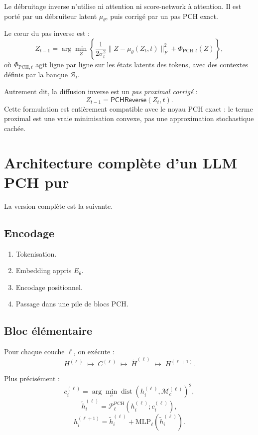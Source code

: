 \documentclass[11pt]{article}
\providecommand{\Ppch}{\mathcal P^{\mathrm{PCH}}}
\begin{document}
Le débruitage inverse n'utilise ni attention ni score-network à attention.
Il est porté par un débruiteur latent \(\mu_\theta\), puis corrigé par un pas PCH exact.

Le cœur du pas inverse est :
\[
Z_{t-1}
=
\arg\min_Z
\left\{
\frac1{2\sigma_t^2}\|Z-\mu_\theta(Z_t,t)\|_F^2
+
\Phi_{\mathrm{PCH},t}(Z)
\right\},
\]
où \(\Phi_{\mathrm{PCH},t}\) agit ligne par ligne sur les états latents des tokens, avec des contextes définis par la banque \(\mathcal B_t\).

Autrement dit, la diffusion inverse est un \emph{pas proximal corrigé} :
\[
Z_{t-1}
=
\mathsf{PCHReverse}(Z_t,t).
\]
Cette formulation est entièrement compatible avec le noyau PCH exact : le terme proximal est une vraie minimisation convexe, pas une approximation stochastique cachée.

\section{Architecture complète d'un LLM PCH pur}

La version complète est la suivante.

\subsection{Encodage}

\begin{enumerate}[leftmargin=2em]
    \item Tokenisation.
    \item Embedding appris \(E_\theta\).
    \item Encodage positionnel.
    \item Passage dans une pile de blocs PCH.
\end{enumerate}

\subsection{Bloc élémentaire}

Pour chaque couche \(\ell\), on exécute :
\[
H^{(\ell)}
\;\mapsto\;
C^{(\ell)}
\;\mapsto\;
\tilde H^{(\ell)}
\;\mapsto\;
H^{(\ell+1)}.
\]

Plus précisément :
\[
c_i^{(\ell)}
=
\arg\min_c \operatorname{dist}(h_i^{(\ell)}, \mathcal M_c^{(\ell)})^2,
\]
\[
\tilde h_i^{(\ell)}
=
\Ppch_\ell(h_i^{(\ell)};c_i^{(\ell)}),
\]
\[
h_i^{(\ell+1)}
=
\tilde h_i^{(\ell)}+\mathrm{MLP}_\ell(\tilde h_i^{(\ell)}).
\]
\end{document}
